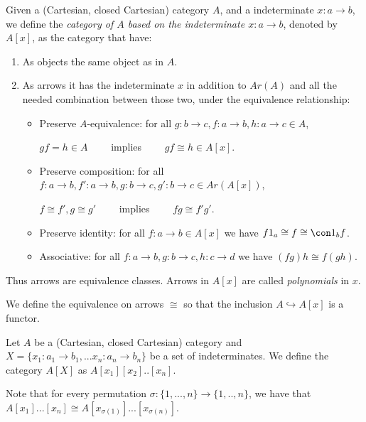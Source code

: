\begin{definition}\cite[Part I, Chapter 5]{lambek1988introduction}
  Given a (Cartesian, closed Cartesian) category $A$, and a indeterminate $x: a \to b$, we define the \emph{category of $A$ based on the indeterminate $x:a\to b$}, denoted by $A[x]$, as the category that have:
  \begin{enumerate}
  \item As objects the same object as in $A$.
  \item As arrows it has the indeterminate $x$ in addition to $Ar(A)$ and all the needed combination between those two, under the equivalence relationship:
    \begin{itemize}
    \item Preserve   $A$-equivalence: for all $g:b\to c,f:a\to b, h: a\to c\in A$,
      \begin{center}
        $gf=h \in A\qquad $ implies $\qquad gf \cong h\in A[x].$
      \end{center}

    \item Preserve composition: for all $f:a\to b,f':a\to b,g:b\to c,g': b \to c\in Ar(A[x])$,
      \begin{center}
        $f\cong f', g\cong g'\qquad$ implies $\qquad fg\cong f'g'$.
      \end{center}
      
    \item Preserve identity: for all $f:a\to b\in A[x]$ we have $f1_a\cong f \cong \con 1_bf$.
    \item Associative: for all $f:a\to b, g:b\to c, h: c\to d$ we have $(fg)h\cong f(gh)$.
    \end{itemize}
  \end{enumerate}
  Thus arrows are equivalence classes. Arrows in $A[x]$ are called \emph{polynomials} in $x$.
\end{definition}
\begin{remark}
  We define the equivalence on arrows $\cong$ so that the inclusion $A\hookrightarrow A[x]$ is a functor.
\end{remark}
\begin{definition}
Let $A$ be a (Cartesian, closed Cartesian) category and $X=\{x_1:a_1 \to b_1, ... x_n:a_n \to b_n\}$ be a set of indeterminates. We define the category $A[X]$ as $A[x_1][x_2]..[x_n]$.
\end{definition}
\begin{remark}
Note that for every permutation $\sigma : \{1,...,n\}\to \{1,..,n\}$, we have that $A[x_1]...[x_n]\cong A[x_{\sigma(1)}]...[x_{\sigma(n)}]$. 
\end{remark}

